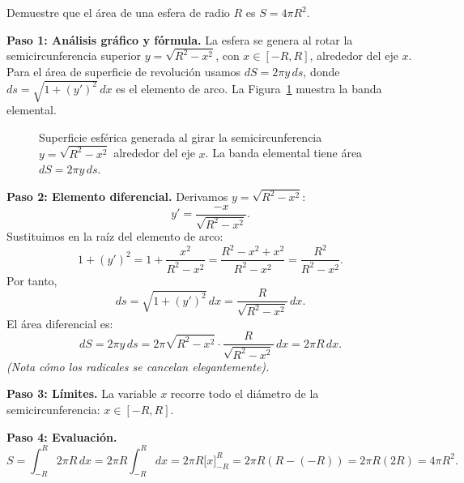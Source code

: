 \begin{example}
Demuestre que el área de una esfera de radio $R$ es $S = 4\pi R^2$.

\begin{myproof}
\textbf{Paso 1: Análisis gráfico y fórmula.}
La esfera se genera al rotar la semicircunferencia superior $y=\sqrt{R^2-x^2}$, 
con $x\in[-R,R]$, alrededor del eje $x$. Para el área de superficie de revolución 
usamos $dS = 2\pi y \, ds$, donde $ds=\sqrt{1+(y')^2}\,dx$ es el elemento de arco.
La Figura~\ref{fig:superficie_esfera} muestra la banda elemental.

\begin{figure}[H]
\centering
\caption{Superficie esférica generada al girar la semicircunferencia $y=\sqrt{R^2-x^2}$ alrededor del eje $x$. La banda elemental tiene área $dS=2\pi y\,ds$.}
\label{fig:superficie_esfera}
\end{figure}

\textbf{Paso 2: Elemento diferencial.}
Derivamos $y=\sqrt{R^2-x^2}$:
\[
  y' = \frac{-x}{\sqrt{R^2-x^2}}.
\]
Sustituimos en la raíz del elemento de arco:
\[
  1+(y')^2 = 1+\frac{x^2}{R^2-x^2} = \frac{R^2-x^2+x^2}{R^2-x^2} = \frac{R^2}{R^2-x^2}.
\]
Por tanto,
\[
  ds = \sqrt{1+(y')^2}\,dx = \frac{R}{\sqrt{R^2-x^2}}\,dx.
\]
El área diferencial es:
\[
  dS = 2\pi y \, ds = 2\pi \sqrt{R^2-x^2} \cdot \frac{R}{\sqrt{R^2-x^2}}\,dx = 2\pi R\,dx.
\]
\textit{(Nota cómo los radicales se cancelan elegantemente).}

\textbf{Paso 3: Límites.}
La variable $x$ recorre todo el diámetro de la semicircunferencia: $x\in[-R,R]$.

\textbf{Paso 4: Evaluación.}
\[
  S = \int_{-R}^{R} 2\pi R\,dx
    = 2\pi R \int_{-R}^{R} dx
    = 2\pi R \bigl[x\bigr]_{-R}^{R}
    = 2\pi R (R - (-R))
    = 2\pi R (2R)
    = \boxed{4\pi R^2}.
\]
\end{myproof}
\end{example}

